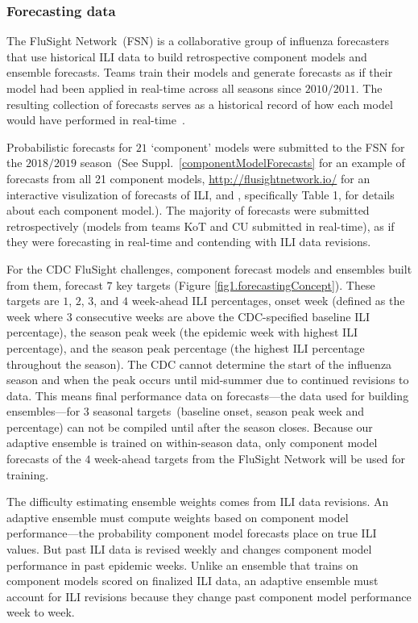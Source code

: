 \documentclass[sagev,times,Review,10pt]{sagej}
\begin{document}
\subsubsection{Forecasting data}

The FluSight Network~(FSN) is a collaborative group of influenza forecasters that use historical ILI data to build retrospective component models and ensemble forecasts.
Teams train their models and generate forecasts as if their model had been applied in real-time across all seasons since $2010/2011$.
The resulting collection of forecasts serves as a historical record of how each model would have performed in real-time~\citep{reich2019collaborativepnas}.

Probabilistic forecasts for $21$ `component' models were submitted to the FSN for the $2018/2019$ season~(See Suppl.~\ref{componentModelForecasts} for an example of forecasts from all 21 component models,  \href{Flusightnetwork.io}{http://flusightnetwork.io/} for an interactive visulization of forecasts of ILI, and \cite{reich2019collaborativepnas}, specifically Table 1, for details about each component model.).
The majority of forecasts were submitted retrospectively (models from teams KoT and CU submitted in real-time), as if they were forecasting in real-time and contending with ILI data revisions.

For the CDC FluSight challenges, component forecast models and ensembles built from them, forecast $7$ key targets (Figure \ref{fig1.forecastingConcept}). These targets are $1$, $2$, $3$, and $4$ week-ahead ILI percentages, onset week (defined as the week where $3$ consecutive weeks are above the CDC-specified baseline ILI percentage), the season peak week (the epidemic week with highest ILI percentage), and the season peak percentage (the highest ILI percentage throughout the season).
The CDC cannot determine the start of the influenza season and when the peak occurs until mid-summer due to continued revisions to data.
This means final performance data on forecasts---the data used for building ensembles---for $3$ seasonal targets~(baseline onset, season peak week and percentage) can not be compiled until after the season closes.
Because our adaptive ensemble is trained on within-season data, only component model forecasts of the $4$ week-ahead targets from the FluSight Network will be used for training.

The difficulty estimating ensemble weights comes from ILI data revisions.
An adaptive ensemble must compute weights based on component model performance---the probability component model forecasts place on true ILI values.
But past ILI data is revised weekly and changes component model performance in past epidemic weeks.
Unlike an ensemble that trains on component models scored on finalized ILI data, an adaptive ensemble must account for ILI revisions because they change past component model performance week to week.
\end{document}
